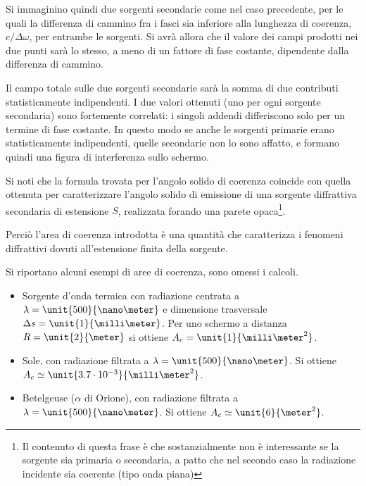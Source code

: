 Si immaginino quindi due sorgenti secondarie come nel caso precedente, per le quali la differenza di cammino fra i fasci sia inferiore alla lunghezza di coerenza, $ c/\Delta\omega $, per entrambe le sorgenti. Si avrà allora che il valore dei campi prodotti nei due punti sarà lo stesso, a meno di un fattore di fase costante, dipendente dalla differenza di cammino.

Il campo totale sulle due sorgenti secondarie sarà la somma di due contributi statisticamente indipendenti. I due valori ottenuti (uno per ogni sorgente secondaria) sono fortemente correlati: i singoli addendi differiscono solo per un termine di fase costante. In questo modo se anche le sorgenti primarie erano statisticamente indipendenti, quelle secondarie non lo sono affatto, e formano quindi una figura di interferenza sullo schermo.

\begin{oss}[Diffrazione]
	Si noti che la formula trovata per l'angolo solido di coerenza coincide con quella ottenuta per caratterizzare l'angolo solido di emissione di una sorgente diffrattiva secondaria di estensione $ S $, realizzata forando una parete opaca\footnote{Il contenuto di questa frase è che sostanzialmente non è interessante se la sorgente sia primaria o secondaria, a patto che nel secondo caso la radiazione incidente sia coerente (tipo onda piana)}.
	
	Perciò l'area di coerenza introdotta è una quantità che caratterizza i fenomeni diffrattivi dovuti all'estensione finita della sorgente.
\end{oss}

\begin{es}
	Si riportano alcuni esempi di aree di coerenza, sono omessi i calcoli.
	\begin{itemize}
		\item Sorgente d'onda termica con radiazione centrata a $ \lambda = \unit{500}{\nano\meter} $ e dimensione trasversale $ \Delta s = \unit{1}{\milli\meter} $. Per uno schermo a distanza $ R = \unit{2}{\meter} $ si ottiene $ A_c = \unit{1}{\milli\meter^2} $.
		\item Sole, con radiazione filtrata a $ \lambda = \unit{500}{\nano\meter} $. Si ottiene $ A_c \simeq \unit{3.7 \cdot 10^{-3}}{\milli\meter^2} $.
		\item Betelgeuse ($ \alpha $ di Orione), con radiazione filtrata a $ \lambda = \unit{500}{\nano\meter} $. Si ottiene $ A_c \simeq \unit{6}{\meter^2} $.
	\end{itemize}
\end{es}


